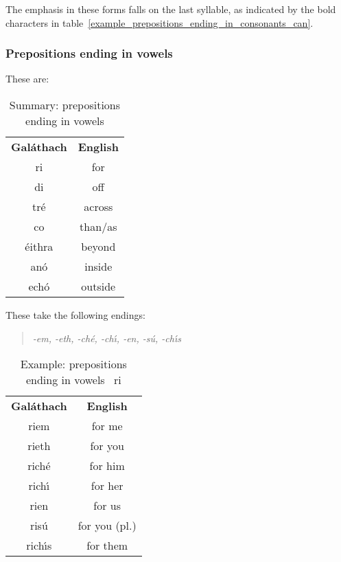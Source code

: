 The emphasis in these forms falls on the last syllable, as indicated by the bold characters in table~\ref{example_prepositions_ending_in_consonants_can}.

\subsubsection{Prepositions ending in vowels}

These are:
\begin{table}[H]
\centering
\begin{tabular}{cc}
  \toprule
  \textbf{Gal\'{a}thach} & \textbf{English}\\
  \cmidrule(lr){1-1}\cmidrule(lr){2-2}
  ri & for\\
  di & off\\
  tr\'{e} & across\\
  co & than/as\\
  \'{e}ithra & beyond\\
  an\'{o} & inside\\
  ech\'{o} & outside\\
  \bottomrule
\end{tabular}
\caption{Summary: prepositions ending in vowels}
\label{summary_prepositions_ending_in_vowels}
\end{table}

These take the following endings:
\begin{quote}
\textit{-em, -eth, -ch\'{e}, -ch\'{\i}, -en, -s\'{u}, -ch\'{\i}s}
\end{quote}

\begin{table}[H]
\centering
\begin{tabular}{cc}
  \toprule
  \textbf{Gal\'{a}thach} & \textbf{English}\\
  \cmidrule(lr){1-1}\cmidrule(lr){2-2}
  riem & for me\\
  rieth & for you\\
  rich\'{e} & for him\\
  rich\'{\i} & for her\\
  rien & for us\\
  ris\'{u} & for you (pl.)\\
  rich\'{\i}s & for them\\
  \bottomrule
\end{tabular}
\caption{Example: prepositions ending in vowels \textendash\ ri}
\label{example_prepositions_ending_in_vowels_ri}
\end{table}

